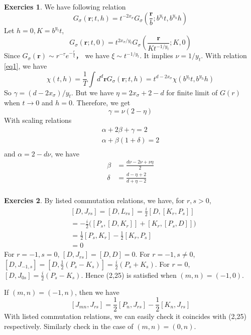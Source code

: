 \documentclass[11pt,a4paper]{article}
\theoremstyle{definition}
\newtheorem{exer}{Exercies}[subsection]
\begin{document}
\begin{exer}
	We have following relation
	\begin{equation}\label{eq1}
	G_{\sigma}(\mathbf{r};t,h) = t^{-2x_{\sigma}}G_\sigma (\frac{\mathbf{r}}{b};b^{y_t}t,b^{y_h}h)
	\end{equation}
	Let $h=0, K= b^{y_t}t$,	
	\[
	G_{\sigma}(\mathbf{r};t,0) = t^{2x_{\sigma}/y_{t}}G_\sigma (\frac{\mathbf{r}}{K t^{-1/y_{t}}};K,0)
	\]
	Since $ G_{\sigma}(\mathbf{r}) \sim r^{-\tau} e^{-\frac{r}{\xi}}$， we have $\xi \sim t^{-1/y_t}$. It implies $\nu = 1/y_t$. With relation \ref{eq1}, we have 
	\[
	\chi(t,h)= \frac{1}{T} \int d^d \mathbf{r} G_\sigma (\mathbf{r};t,h)= t^{d-2x_\sigma} \chi (b^{y_t}t, b^{y_h}h)
	\]
	So $\gamma = (d-2x_\sigma)/y_t$. But we have $\eta = 2 x_\sigma +2 -d$ for finite limit of $G(r)$ when $t \to 0$ and $h=0$. Therefore, we get
	\[
	\gamma = \nu(2-\eta)
	\]With scaling relations
	\[
	\begin{aligned}
	\alpha + 2 \beta + \gamma =2\\
	\alpha + \beta (1+\delta) =2\\
	\end{aligned}
	\]
	and $\alpha = 2 -d \nu$, we have
	\[
	\begin{aligned}
	\beta &= \frac{d\nu -2\nu + \nu \eta}{2}\\
	\delta &= \frac{d-\eta +2}{d+\eta -2}\\
	\end{aligned}
	\]
	\end{exer}
\begin{exer}
	By listed commutation relations, we have, for $r, s > 0$,
	\[
	\begin{aligned}
	&[D, J_{rs}]= [D, L_{rs}] = \frac{i}{2} [D, [K_r, P_s]]\\
	 & =-\frac{i}{2}\big([P_s,[D,K_r]]+ [K_r,[P_s,D]]\big)\\
	 & =\frac{1}{2}[P_s, K_r] -\frac{1}{2}[K_r, P_s]\\
	 &=0
	\end{aligned}
	\]
	For $r=-1,s=0$, $[D,J_{rs}]= [D,D]=0$. For $r=-1, s\neq 0$, $[D,J_{-1,s}]=[D,\frac{1}{2}(P_s - K_s)]= \frac{i}{2}(P_s +K_s)$. For $r=0$, $[D, J_{0s}] = \frac{i}{2}(P_s - K_s)$. Hence (2,25) is satisfied when $(m,n)=(-1,0)$.
	
	If $(m,n)=(-1,n)$, then we have 
	\[
	[J_{mn},J_{rs}] = \frac{1}{2}[P_n, J_{rs}] -\frac{1	}{2} [K_n, J_{rs}]
	\]
	With listed commutation relations, we can easily check it coincides with (2,25) respectively. Similarly check in the case of $(m,n)= (0,n)$. 
\end{exer}
\newpage
\end{document}
